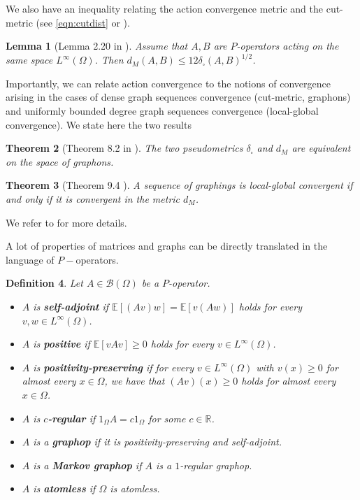 \documentclass[11pt]{article}
\newtheorem{theorem}{Theorem}[section]
\newtheorem{lemma}[theorem]{Lemma}
\newtheorem{definition}[theorem]{Definition}
\begin{document}
We also have an inequality relating the action convergence metric and the cut-metric (see \eqref{eqn:cutdist} or \cite{LovaszGraphLimits}). 

\begin{lemma} [Lemma 2.20 in \cite{backhausz2018action}]Assume that $A,B$ are $P$-operators acting on the same space $L^\infty(\Omega)$. Then $d_M(A,B)\leq 12\delta_\square(A,B)^{1/2}$.
\end{lemma}

Importantly, we can relate action convergence to the notions of convergence arising in the cases of dense graph sequences convergence (cut-metric, graphons) and uniformly bounded degree graph sequences convergence (local-global convergence). We state here the two results

\begin{theorem}[Theorem 8.2 in \cite{backhausz2018action}]\label{TheoremEqCutMetr} The two pseudometrics $\delta_\square$ and $d_M$ are equivalent on the space of graphons. 
\end{theorem}

\begin{theorem}[Theorem 9.4 \cite{backhausz2018action}] A sequence of graphings is local-global convergent if and only if it is convergent in the metric $d_M$.
\end{theorem}

We refer to \cite{backhausz2018action} for more details.

A lot of properties of matrices and graphs can be directly translated in the language of $P-$operators.

\begin{definition} Let $A\in\mathcal{B}(\Omega)$ be a $P$-operator. 
\begin{itemize}
\item $A$ is {\bf self-adjoint} if $\mathbb{E}[(Av)w]=\mathbb{E}[v(Aw)]$ holds for every $v,w\in L^\infty(\Omega)$.
\item $A$ is {\bf positive} if $\mathbb{E}[vAv]\geq 0$ holds for every $v\in L^\infty(\Omega)$.
\item $A$ is {\bf positivity-preserving} if for every $v\in L^\infty(\Omega)$ with $v(x)\geq 0$ for almost every $x\in\Omega$, we have that $(Av)(x)\geq 0$ holds for almost every $x\in\Omega$.
\item $A$ is {\bf $c$-regular} if $1_\Omega A=c1_\Omega$ for some $c\in\mathbb{R}$.
\item $A$ is a {\bf graphop} if it is positivity-preserving and self-adjoint.
\item $A$ is a {\bf Markov graphop} if $A$ is a $1$-regular graphop.
\item $A$ is {\bf atomless} if $\Omega$ is atomless.
\end{itemize}
\end{definition}
\end{document}

